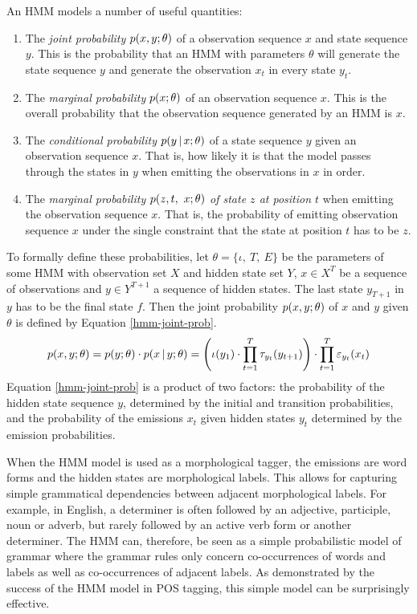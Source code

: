 An HMM models a number of useful quantities:
\begin{enumerate}
\item The {\it joint probability} $p(x,y\mbox{$ ; \, $}\theta)$ of a observation
  sequence $x$ and state sequence $y$. This is the probability that an
  HMM with parameters $\theta$ will generate the state sequence $y$
  and generate the observation $x_t$ in every state $y_t$.
\item The {\it marginal probability} $p(x\mbox{$ ; \, $} \theta)$ of an
  observation sequence $x$. This is the overall probability that the
  observation sequence generated by an HMM is $x$.
\item The {\it conditional probability} $p(y\mbox{$ \, | \, $} x\mbox{$ ; \, $}\theta)$ of a
  state sequence $y$ given an observation sequence $x$. That is, how
  likely it is that the model passes through the states in $y$ when
  emitting the observations in $x$ in order.
\item The {\it marginal probability $p(z, t,\ x\mbox{$ ; \, $} \theta)$ of
    state $z$ at position $t$} when emitting the observation sequence
  $x$. That is, the probability of emitting observation sequence $x$
  under the single constraint that the state at position $t$ has to be $z$.
\end{enumerate}

To formally define these probabilities, let $\theta = \{\iota,\ T,\
E\}$ be the parameters of some HMM with observation set $X$ and hidden
state set $Y$, $x \in X^T$ be a sequence of
observations and $y \in Y^{T+1}$ a sequence of
hidden states. The last state $y_{T+1}$ in $y$ has to be the final state
$f$. Then the joint probability $p(x,y\mbox{$ ; \, $}\theta)$ of $x$ and $y$
given $\theta$ is defined by Equation \eqref{hmm-joint-prob}.
\begin{equation}
p(x,y\mbox{$ ; \, $}\theta) = p(y\mbox{$ ; \, $}\theta)\cdot p(x \mbox{$ \, | \, $} y\mbox{$ ; \, $}\theta)= \Bigg(\iota(y_1) \cdot \prod_{t = 1}^{T} \tau_{y_t}(y_{t + 1})\Bigg) \cdot \prod_{t = 1}^T \varepsilon_{y_t}(x_t)\label{hmm-joint-prob}
\end{equation}
Equation \eqref{hmm-joint-prob} is a product of two factors: the
probability of the hidden state sequence $y$, determined by the
initial and transition probabilities, and the probability of the
emissions $x_t$ given hidden states $y_t$ determined by the emission
probabilities.

When the HMM model is used as a morphological tagger, the emissions
are word forms and the hidden states are morphological labels. This
allows for capturing simple grammatical dependencies between adjacent
morphological labels. For example, in English, a determiner is often
followed by an adjective, participle, noun or adverb, but rarely
followed by an active verb form or another determiner. The HMM can,
therefore, be seen as a simple probabilistic model of grammar
where the grammar rules only concern co-occurrences of words and
labels as well as co-occurrences of adjacent labels. As demonstrated
by the success of the HMM model in POS tagging, this simple model can
be surprisingly effective.

